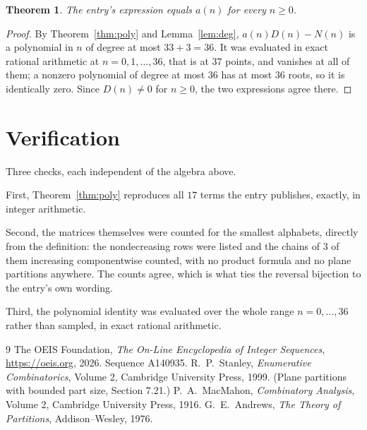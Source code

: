 \documentclass[11pt,a4paper]{article}
\theoremstyle{plain}
\newtheorem{theorem}{Theorem}
\theoremstyle{definition}
\begin{document}
\begin{theorem}
The entry's expression equals $a(n)$ for every $n\ge0$.
\end{theorem}

\begin{proof}
By Theorem~\ref{thm:poly} and Lemma~\ref{lem:deg}, $a(n)D(n)-N(n)$ is a polynomial in $n$
of degree at most $33+3=36$. It was evaluated in exact rational arithmetic at
$n=0,1,\dots,36$, that is at $37$ points, and vanishes at all of them; a nonzero polynomial
of degree at most $36$ has at most $36$ roots, so it is identically zero. Since $D(n)\neq0$
for $n\ge0$, the two expressions agree there.
\end{proof}

\section{Verification}

Three checks, each independent of the algebra above.

First, Theorem~\ref{thm:poly} reproduces all $17$ terms the entry publishes,
exactly, in integer arithmetic.

Second, the matrices themselves were counted for the smallest alphabets, directly from the
definition: the nondecreasing rows were listed and the chains of $3$ of them increasing
componentwise counted, with no product formula and no plane partitions anywhere. The counts
agree, which is what ties the reversal bijection to the entry's own wording.

Third, the polynomial identity was evaluated over the whole range $n=0,\dots,36$ rather than
sampled, in exact rational arithmetic.

\begin{thebibliography}{9}
 The OEIS Foundation, \emph{The On-Line Encyclopedia of Integer
Sequences}, \url{https://oeis.org}, 2026. Sequence A140935.
 R.~P.~Stanley, \emph{Enumerative Combinatorics}, Volume 2, Cambridge
University Press, 1999. (Plane partitions with bounded part size, Section 7.21.)
 P.~A.~MacMahon, \emph{Combinatory Analysis}, Volume 2, Cambridge
University Press, 1916.
 G.~E.~Andrews, \emph{The Theory of Partitions}, Addison--Wesley, 1976.
\end{thebibliography}
\end{document}
